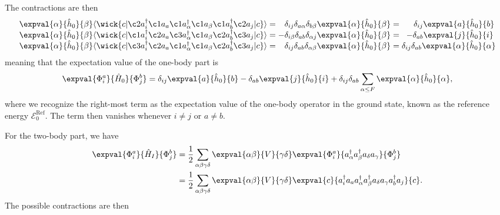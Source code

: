 The contractions are then
\begin{equation*}
    \arraycolsep=1.4pt
    \begin{array}{rlrcr}
        \expval{\alpha}{\hat{h}_0}{\beta}
        \langle
        \wick{
            c
            \vert
            \c2 a_i^\dagger \c1 a_a \c1 a_\alpha^\dagger \c1 a_\beta \c1 a_b^\dagger \c2 a_j
            \vert
            c
        }
        \rangle
        &=& \delta_{ij} \delta_{a \alpha} \delta_{b \beta} \expval{\alpha}{\hat{h}_0}{\beta}
        &=& \delta_{ij} \expval{a}{\hat{h}_0}{b} \,
        \\
        \expval{\alpha}{\hat{h}_0}{\beta}
        \langle
        \wick{
            c
            \vert
            \c1 a_i^\dagger \c2 a_a \c3 a_\alpha^\dagger \c1 a_\beta \c2 a_b^\dagger \c3 a_j
            \vert
            c
        }
        \rangle
        &= &- \delta_{i \beta} \delta_{a b} \delta_{\alpha j} \expval{\alpha}{\hat{h}_0}{\beta}
        &=& -\delta_{ab} \expval{j}{\hat{h}_0}{i} \;  \\
        \expval{\alpha}{\hat{h}_0}{\beta}
        \langle
        \wick{
            c
            \vert
            \c3 a_i^\dagger \c2 a_a \c1 a_\alpha^\dagger \c1 a_\beta \c2 a_b^\dagger \c3 a_j
            \vert
            c
        }
        \rangle
        &=& \delta_{i j} \delta_{a b} \delta_{\alpha \beta} \expval{\alpha}{\hat{h}_0}{\beta}
        &=& \delta_{i j} \delta_{a b} \expval{\alpha}{\hat{h}_0}{\alpha} \\
    \end{array}
\end{equation*}
meaning that the expectation value of the one-body part is
\begin{equation*}
    \expval{\Phi_i^a}{\hat{H}_0}{\Phi_j^b} = \delta_{ij} \expval{a}{\hat{h}_0}{b} - \delta_{ab} \expval{j}{\hat{h}_0}{i} + \delta_{ij} \delta_{ab} \sum_{\alpha \leq F} \expval{\alpha}{\hat{h}_0}{\alpha},
\end{equation*}
where we recognize the right-most term as the expectation value of the one-body operator in the ground state, known as the reference energy $\mathcal{E}_0^{\text{Ref}}$.
The term then vanishes whenever $i \neq j$ or $a \neq b$.

For the two-body part, we have
\begin{align*}
    \expval{\Phi_i^a}{\hat{H}_I}{\Phi_j^b} &= \frac{1}{2} \sum_{\alpha\beta\gamma\delta} \expval{\alpha\beta}{V}{\gamma\delta} \expval{\Phi_i^a}{a_\alpha^\dagger a_\beta^\dagger a_\delta a_\gamma}{\Phi_j^b} \\
    &= \frac{1}{2} \sum_{\alpha\beta\gamma\delta} \expval{\alpha\beta}{V}{\gamma\delta} \expval{c}{a_i^\dagger a_a a_\alpha^\dagger a_\beta^\dagger a_\delta a_\gamma a_b^\dagger a_j}{c}.  \\
\end{align*}
The possible contractions are then


